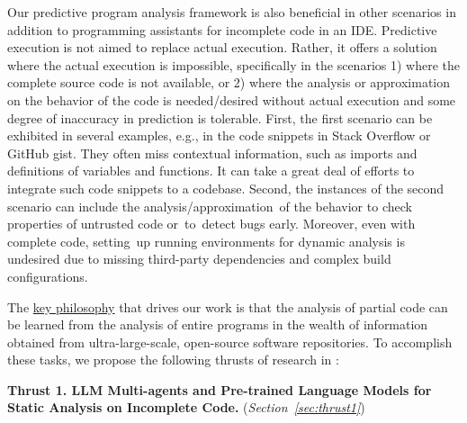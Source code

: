Our predictive program analysis framework is also beneficial in other
scenarios in addition to programming assistants for incomplete code in
an IDE. Predictive execution is not aimed to replace actual
execution. Rather, it offers a solution where the actual execution is
impossible, specifically in the scenarios 1) where the complete source
code is not available, or 2) where the analysis or approximation on
the behavior of the code is needed/desired without actual execution
and some degree of inaccuracy in prediction is tolerable.  First, the
first scenario can be exhibited in several examples, e.g., in the code
snippets in Stack Overflow or GitHub gist. They often miss contextual
information, such as imports and definitions of variables and
functions. It can take a great deal of efforts to integrate such code
snippets to a codebase.
Second, the instances of the second scenario can include the
analysis/approximation~of the behavior to check properties of
untrusted code or~to~detect bugs early. Moreover, even with complete
code, setting~up running environments for dynamic analysis is
undesired due to missing third-party dependencies and complex build
configurations.

The \underline{key philosophy} that drives our work is that the analysis of
partial code can be learned from the analysis of entire programs in
the wealth of information obtained from ultra-large-scale, open-source
software repositories. To accomplish these tasks, we propose the
following thrusts of research in {\tool}:

\noindent \textbf{Thrust 1. LLM Multi-agents and Pre-trained Language Models for Static Analysis on Incomplete Code.} ({\em Section~\ref{sec:thrust1}})




